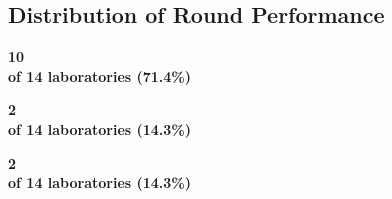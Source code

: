 \subsection{Distribution of Round Performance}
\noindent
\begin{minipage}[t]{0.325\textwidth}
\begin{tcolorbox}[satbox, title={\faCheckCircle\ Satisfactory}]
\centering \fontsize{22}{24}\selectfont\bfseries\color{ptteal} 10 \\
\small of 14 laboratories (71.4\%)
\end{tcolorbox}
\end{minipage}\hfill
\begin{minipage}[t]{0.325\textwidth}
\begin{tcolorbox}[warnbox, title={\faExclamationTriangle\ Questionable}]
\centering \fontsize{22}{24}\selectfont\bfseries\color{ptamber} 2 \\
\small of 14 laboratories (14.3\%)
\end{tcolorbox}
\end{minipage}\hfill
\begin{minipage}[t]{0.325\textwidth}
\begin{tcolorbox}[critbox, title={\faTimesCircle\ Unsatisfactory}]
\centering \fontsize{22}{24}\selectfont\bfseries\color{ptred} 2 \\
\small of 14 laboratories (14.3\%)
\end{tcolorbox}
\end{minipage}

\vspace{0.5em}
\par

